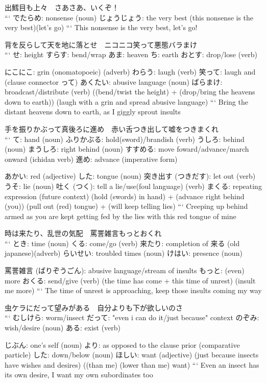 出鱈目も上々　さあさあ、いくぞ！ \\
```
でたらめ: nonsense (noun)
  じょうじょう: the very best
(this nonsense is the very best)(let's go)
```
This nonsense is the very best, let's go!

背を反らして天を地に落とせ　ニコニコ笑って悪態バラまけ \\
```
せ: height
すらす: bend/wrap
あま: heaven
ち: earth
おとす: drop/lose (verb)

にこにこ: grin (onomatopoeic) (adverb)
わらう: laugh (verb)
笑って: laugh and (clause connector って)
あくたい: abusive language (noun)
ばらまけ: broadcast/distribute (verb)
((bend/twist the height) + (drop/bring the heavens down to earth)) (laugh with a grin and spread abusive language)
```
Bring the distant heavens down to earth, as I giggly sprout insults

手を振りかぶって真後ろに進め　赤い舌つき出して嘘をつきまくれ \\
```
て: hand (noun)
ふりかぶる: hold(sword)/brandish (verb)
うしろ: behind (noun)
まうしろ: right behind (noun)
すすめる: move foward/advance/march onward (ichidan verb)
進め: advance (imperative form)

あかい: red (adjective)
した: tongue (noun)
突き出す (つきだす): let out (verb)
うそ: lie (noun)
吐く (つく): tell a lie/use(foul language) (verb)
まくる: repeating expression (future context)
(hold (swords) in hand) + (advance right behind (you)) (pull out (red) tongue) + (will keep telling lies)
```
Creeping up behind armed as you are kept getting fed by the lies with this red tongue of mine

時は来たり、乱世の気配　罵詈雑言もっとおくれ \\
```
とき: time (noun)
くる: come/go (verb)
来たり: completion of 来る (old japanese)(adverb)
らいせい: troubled times (noun)
けはい: presence (noun)

罵詈雑言 (ばりぞうごん): abusive language/stream of insults
もっと: (even) more
おくる: send/give (verb)
(the time has come + this time of unrest) (insult me more)
```
The time of unrest is approaching, keep those insults coming my way

虫ケラにだって望みがある　自分よりも下が欲しいのさ \\
```
むしけら: worm/insect
だって: "even i can do it/just because" context
のぞみ: wish/desire (noun)
ある: exist (verb)

じぶん: one's self (noun)
より: as opposed to the clause prior (comparative particle)
した: down/below (noun)
ほしい: want (adjective)
(just because insects have wishes and desires) ((than me) (lower than me) want)
```
Even an insect has its own desire, I want my own subordinates too

